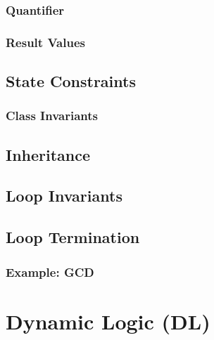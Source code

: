 \documentclass[a4paper, 11pt, accentcolor = tud3b]{tudreport}
\begin{document}
			\subsection{Quantifier} %

			\subsection{Result Values} %

		\section{State Constraints} %

			\subsection{Class Invariants} %

		\section{Inheritance} %

		\section{Loop Invariants} %

		\section{Loop Termination} %

			\subsection{Example: GCD} %

	\chapter{Dynamic Logic (DL)} %
		\label{c:dl}
	
\end{document}
